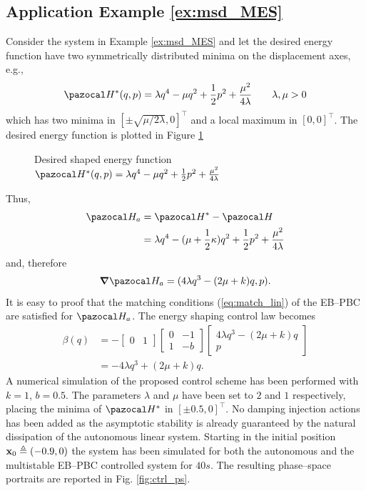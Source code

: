 \subsection{Application Example \ref{ex:msd_MES}}
%
Consider the system in Example \ref{ex:msd_MES} and let the desired energy function have two symmetrically distributed minima on the displacement axes, e.g.,
%
\begin{equation}
    \Ha^*(q,p) = \lambda q^4-\mu q^2 + \frac{1}{2}p^2 + \frac{\mu^2}{4\lambda}\qquad\lambda,\mu>0
\end{equation}
%
which has two minima in $[\pm\sqrt{\mu/2\lambda},0]^\top$ and a local maximum in $[0,0]^\top$. The desired energy function is plotted in Figure \ref{fig:shaped_en}
%
\begin{figure}
    \centering
    
    \caption[Desired shaped energy function]{Desired shaped energy function $\Ha^*(q,p) = \lambda q^4-\mu q^2 + \frac{1}{2}p^2 + \frac{\mu^2}{4\lambda}$}
    \label{fig:shaped_en}
\end{figure}
%
Thus, 
%
\begin{align}
    \Ha_a & = \Ha^* - \Ha \\
          & = \lambda q^4-(\mu+\frac{1}{2}\kappa)q^2 + \frac{1}{2}p^2 + \frac{\mu^2}{4\lambda}
\end{align}
%
and, therefore
%
\begin{equation}
    \bm\nabla\Ha_a = (4\lambda q^3-(2\mu + k)q,p).
\end{equation}
%
It is easy to proof that the matching conditions (\ref{eq:match_lin}) of the EB--PBC are satisfied for $\Ha_a$. The energy shaping control law becomes
%
\begin{align}\label{eq:ex_ctrl}
    \beta(q) &= -\begin{bmatrix}0&1\end{bmatrix}\begin{bmatrix}0&-1\\1&-b\end{bmatrix}\begin{bmatrix}4\lambda q^3-(2\mu + k)q\\p\end{bmatrix}\\
             &= -4\lambda q^3+(2\mu + k)q.
\end{align}
%
A numerical simulation of the proposed control scheme has been performed with $k = 1$, $b = 0.5$. The parameters $\lambda$ and $\mu$ have been set to $2$ and $1$ respectively, placing the minima of $\Ha^*$ in $[\pm0.5,0]^\top$. No damping injection actions has been added as the asymptotic stability is already guaranteed by the natural dissipation of the autonomous linear system. Starting in the initial position $\mathbf{x}_0 \triangleq (-0.9,0)$ the system has been simulated for both the  autonomous and the multistable EB--PBC controlled system for $40s$. The resulting phase--space portraits are reported in Fig. \ref{fig:ctrl_ps}.

